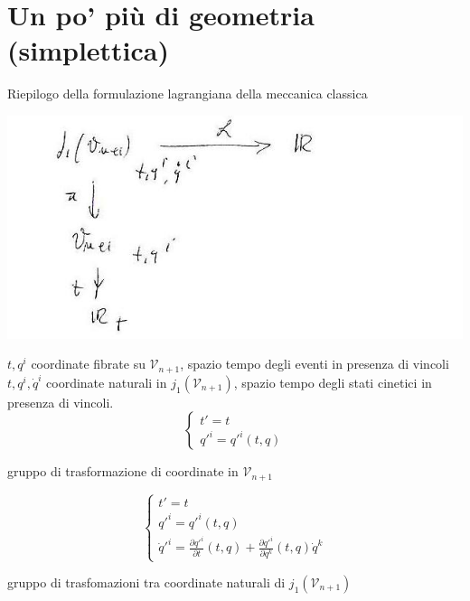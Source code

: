 \section{Un po' più di geometria (simplettica)}
\setcounter{equation}{0}
Riepilogo della formulazione lagrangiana della meccanica classica \\

\begin{center}
\includegraphics[width=0.5\columnwidth]{media/un-po-di-geometria-simplettica/18-1.jpg}
\end{center}

$ t, q^i $ coordinate fibrate su $\mathcal{V}_{n+1}$, spazio tempo degli eventi in presenza di vincoli \\

$ t, q^i, \dot{q}^i $ coordinate naturali in $j_1 (\mathcal{V}_{n+1})$, spazio tempo degli stati cinetici in presenza di vincoli. \\

\begin{equation*}
\begin{cases}
t' = t \\
q'^i = q'^i (t, q)
\end{cases}
\end{equation*}

\begin{center}
gruppo di trasformazione di coordinate in $\mathcal{V}_{n+1}$
\end{center}

\begin{equation*}
\begin{cases}
t' = t \\
q'^i = q'^i (t, q) \\
\dot{q}'^i = \frac{\partial q'^i}{\partial t} (t, q) + \frac{\partial q'^i}{\partial q^k} (t, q) \dot{q}^k
\end{cases}
\end{equation*}

\begin{center}
gruppo di trasfomazioni tra coordinate naturali di $j_1 (\mathcal{V}_{n+1})$
\end{center}


